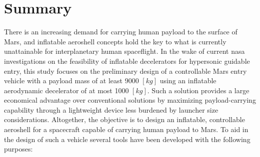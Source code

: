 \section*{Summary}\label{cha:summary}
There is an increasing demand for carrying human payload to the surface of Mars, and inflatable aeroshell concepts hold the key to what is currently unattainable for interplanetary human spaceflight. In the wake of current \acrshort{nasa} investigations on the feasibility of inflatable decelerators for hypersonic guidable entry, this study focuses on the preliminary design of a controllable Mars entry vehicle with a payload mass of at least 9000 $\left[kg\right]$ using an inflatable aerodynamic decelerator of at most 1000 $\left[kg\right]$. Such a solution provides a large economical advantage over conventional solutions by maximizing payload-carrying capability through a lightweight device less burdened by launcher size considerations. Altogether, the objective is to design an inflatable, controllable aeroshell for a spacecraft capable of carrying human payload to Mars.
\newline
\newline
To aid in the design of such a vehicle several tools have been developed with the following purposes:


